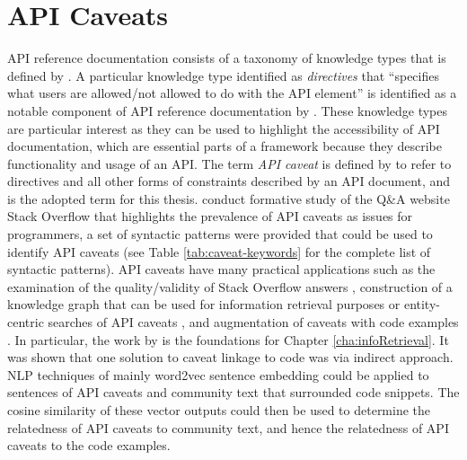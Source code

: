 \section{API Caveats}
\label{sec:related-api-caveats}
API reference documentation consists of a taxonomy of knowledge types that is defined by \cite{maalej2013patterns}. A particular knowledge type identified as \textit{directives} that ``specifies what users are allowed/not allowed to do with the API element'' is identified as a notable component of API reference documentation by \cite{caveat-knowledge-graph}. These knowledge types are particular interest as they can be used to highlight the accessibility of API documentation, which are essential parts of a framework because they describe functionality and usage of an API. The term \textit{API caveat} is defined by \citeauthor{caveat-knowledge-graph} to refer to directives and all other forms of constraints described by an API document, and is the adopted term for this thesis. \citeauthor{caveat-knowledge-graph} conduct formative study of the Q\&A website Stack Overflow that highlights the prevalence of API caveats as issues for programmers, a set of syntactic patterns were provided that could be used to identify API caveats (see Table \ref{tab:caveat-keywords} for the complete list of syntactic patterns). API caveats have many practical applications such as the examination of the quality/validity of Stack Overflow answers \cite{xiaoxue}, construction of a knowledge graph that can be used for information retrieval purposes or entity-centric searches of API caveats \cite{construct-knowledge-graph}, and augmentation of caveats with code examples \cite{jiamou}. In particular, the work by \cite{jiamou} is the foundations for Chapter \ref{cha:infoRetrieval}. It was shown that one solution to caveat linkage to code was via indirect approach. NLP techniques of mainly word2vec sentence embedding could be applied to sentences of API caveats and community text that surrounded code snippets. The cosine similarity of these vector outputs could then be used to determine the relatedness of API caveats to community text, and hence the relatedness of API caveats to the code examples. 

